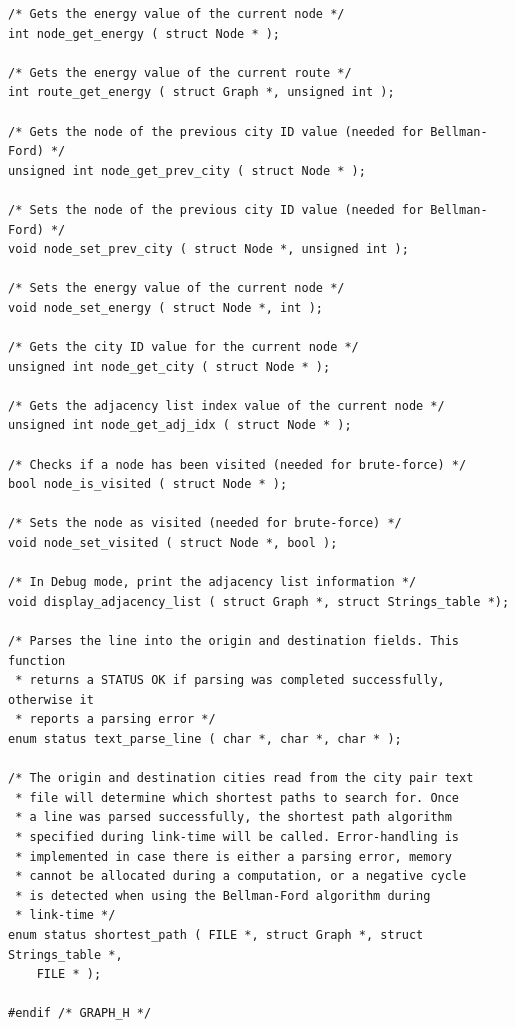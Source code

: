 \documentclass[11pt]{article}
\begin{document}
\begin{verbatim}
/* Gets the energy value of the current node */
int node_get_energy ( struct Node * );

/* Gets the energy value of the current route */
int route_get_energy ( struct Graph *, unsigned int );

/* Gets the node of the previous city ID value (needed for Bellman-Ford) */
unsigned int node_get_prev_city ( struct Node * );

/* Sets the node of the previous city ID value (needed for Bellman-Ford) */
void node_set_prev_city ( struct Node *, unsigned int );

/* Sets the energy value of the current node */
void node_set_energy ( struct Node *, int );

/* Gets the city ID value for the current node */
unsigned int node_get_city ( struct Node * );

/* Gets the adjacency list index value of the current node */
unsigned int node_get_adj_idx ( struct Node * );

/* Checks if a node has been visited (needed for brute-force) */
bool node_is_visited ( struct Node * );

/* Sets the node as visited (needed for brute-force) */
void node_set_visited ( struct Node *, bool );

/* In Debug mode, print the adjacency list information */
void display_adjacency_list ( struct Graph *, struct Strings_table *);

/* Parses the line into the origin and destination fields. This function
 * returns a STATUS OK if parsing was completed successfully, otherwise it
 * reports a parsing error */
enum status text_parse_line ( char *, char *, char * );

/* The origin and destination cities read from the city pair text
 * file will determine which shortest paths to search for. Once
 * a line was parsed successfully, the shortest path algorithm
 * specified during link-time will be called. Error-handling is
 * implemented in case there is either a parsing error, memory
 * cannot be allocated during a computation, or a negative cycle
 * is detected when using the Bellman-Ford algorithm during
 * link-time */
enum status shortest_path ( FILE *, struct Graph *, struct Strings_table *,
    FILE * );

#endif /* GRAPH_H */
\end{verbatim}
\newpage
\end{document}
